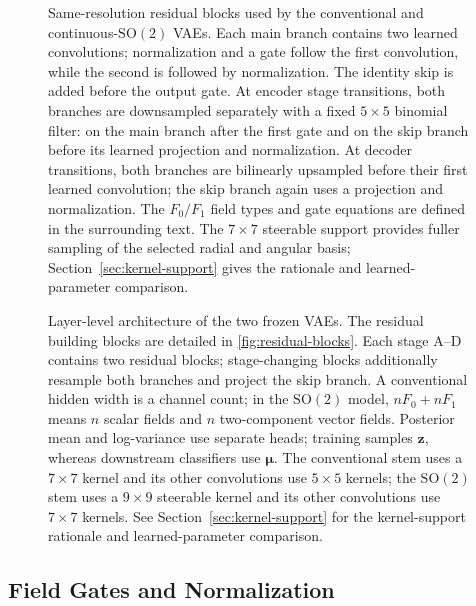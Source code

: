 \documentclass[conference,a4paper]{IEEEtran}
\newcommand{\SOtwo}{\mathrm{SO}(2)}
\begin{document}
\begin{figure}[t]
\centering

\caption{Same-resolution residual blocks used by the conventional and
continuous-$\SOtwo$ VAEs. Each main branch contains two learned convolutions;
normalization and a gate follow the first convolution, while the second is
followed by normalization. The identity skip is added before the output gate.
At encoder stage transitions, both branches are downsampled separately with a
fixed $5\times5$ binomial filter: on the main branch after the first gate and
on the skip branch before its learned projection and normalization. At decoder
transitions, both branches are bilinearly upsampled before their first learned
convolution; the skip branch again uses a projection and normalization. The
$F_0/F_1$ field types and gate equations are defined in the surrounding text.
The $7\times7$ steerable support provides fuller sampling of the selected
radial and angular basis; Section~\ref{sec:kernel-support} gives the rationale
and learned-parameter comparison.}
\label{fig:residual-blocks}
\end{figure}

\begin{figure}[t]
\centering
\resizebox{0.98\textwidth}{!}{}
\caption{Layer-level architecture of the two frozen VAEs. The residual
building blocks are detailed in \autoref{fig:residual-blocks}. Each stage A--D
contains two residual blocks; stage-changing blocks additionally resample both branches and project the skip branch. A
conventional hidden width is a channel count; in the $\SOtwo$ model, $nF_0+nF_1$ means $n$ scalar fields and $n$
two-component vector fields. Posterior mean and log-variance use separate
heads; training samples $\mathbf z$, whereas downstream classifiers use
$\boldsymbol\mu$. The conventional stem uses a $7\times7$ kernel and its
other convolutions use $5\times5$ kernels; the $\SOtwo$ stem uses a
$9\times9$ steerable kernel and its other convolutions use $7\times7$
kernels. See Section~\ref{sec:kernel-support} for the kernel-support rationale
and learned-parameter comparison.}
\label{fig:vae-architectures}
\end{figure}

\subsection{Field Gates and Normalization}
\end{document}
